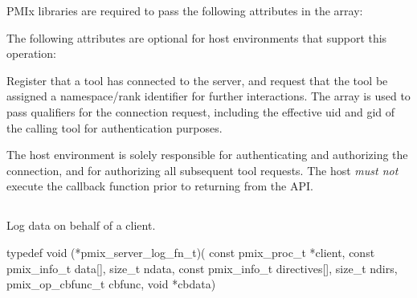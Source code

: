 \begin{arglist}
\end{arglist}

\reqattrstart
\ac{PMIx} libraries are required to pass the following attributes in the  array:


\reqattrend


\optattrstart
The following attributes are optional for host environments that support this operation:


\optattrend

\descr

Register that a tool has connected to the server, and request that the tool be assigned a namespace/rank identifier for further interactions.
The  array is used to pass qualifiers for the connection request, including the effective uid and gid of the calling tool for authentication purposes.

\advicermstart
The host environment is solely responsible for authenticating and authorizing the connection, and for authorizing all subsequent tool requests. The host \emph{must not} execute the callback function prior to returning from the \ac{API}.

\advicermend


\subsection{}

\summary

Log data on behalf of a client.

\format

\cspecificstart
\begin{codepar}
typedef void (*pmix_server_log_fn_t)(
                             const pmix_proc_t *client,
                             const pmix_info_t data[], size_t ndata,
                             const pmix_info_t directives[], size_t ndirs,
                             pmix_op_cbfunc_t cbfunc, void *cbdata)
\end{codepar}
\cspecificend

